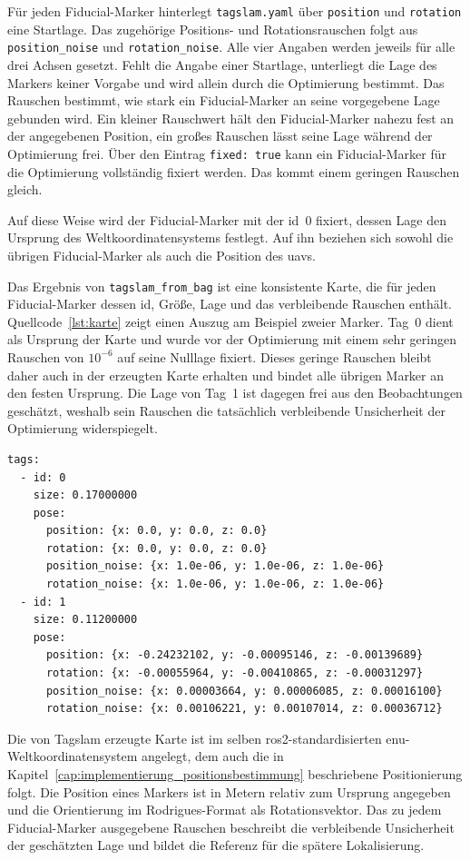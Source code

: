 Für jeden Fiducial-Marker hinterlegt \texttt{tagslam.yaml} über \texttt{position} und \texttt{rotation} eine Startlage.
Das zugehörige Positions- und Rotationsrauschen folgt aus \texttt{position\_\allowbreak noise} und \texttt{rota\allowbreak tion\_\allowbreak noise}.
Alle vier Angaben werden jeweils für alle drei Achsen gesetzt.
Fehlt die Angabe einer Startlage, unterliegt die Lage des Markers keiner Vorgabe und wird allein durch die Optimierung bestimmt.
Das Rauschen bestimmt, wie stark ein Fiducial-Marker an seine vorgegebene Lage gebunden wird. 
Ein kleiner Rauschwert hält den Fiducial-Marker nahezu fest an der angegebenen Position, ein großes Rauschen lässt seine Lage während der Optimierung frei.
Über den Eintrag \texttt{fixed: true} kann ein Fiducial-Marker für die Optimierung vollständig fixiert werden.
Das kommt einem geringen Rauschen gleich. 

Auf diese Weise wird der Fiducial-Marker mit der \gls{id}~0 fixiert, dessen Lage den Ursprung des Weltkoordinatensystems festlegt.
Auf ihn beziehen sich sowohl die übrigen Fiducial-Marker als auch die Position des \gls{uav}s.




Das Ergebnis von \texttt{tagslam\_from\_bag} ist eine konsistente Karte, die für jeden Fiducial-Marker dessen \gls{id}, Größe, Lage und das verbleibende Rauschen enthält.
Quellcode~\ref{lst:karte} zeigt einen Auszug am Beispiel zweier Marker.
Tag~0 dient als Ursprung der Karte und wurde vor der Optimierung mit einem sehr geringen Rauschen von $10^{-6}$ auf seine Nulllage fixiert.
Dieses geringe Rauschen bleibt daher auch in der erzeugten Karte erhalten und bindet alle übrigen Marker an den festen Ursprung.
Die Lage von Tag~1 ist dagegen frei aus den Beobachtungen geschätzt, weshalb sein Rauschen die tatsächlich verbleibende Unsicherheit der Optimierung widerspiegelt.
\newpage
\begin{lstlisting}[caption={Auszug einer erzeugten Karte}, label={lst:karte}, captionpos=b]
tags:
  - id: 0
    size: 0.17000000
    pose:
      position: {x: 0.0, y: 0.0, z: 0.0}
      rotation: {x: 0.0, y: 0.0, z: 0.0}
      position_noise: {x: 1.0e-06, y: 1.0e-06, z: 1.0e-06}
      rotation_noise: {x: 1.0e-06, y: 1.0e-06, z: 1.0e-06}
  - id: 1
    size: 0.11200000
    pose:
      position: {x: -0.24232102, y: -0.00095146, z: -0.00139689}
      rotation: {x: -0.00055964, y: -0.00410865, z: -0.00031297}
      position_noise: {x: 0.00003664, y: 0.00006085, z: 0.00016100}
      rotation_noise: {x: 0.00106221, y: 0.00107014, z: 0.00036712}
\end{lstlisting}
Die von Tag\gls{slam} erzeugte Karte ist im selben \gls{ros2}-standardisierten \gls{enu}-Weltkoordinatensystem angelegt, dem auch die in Kapitel~\ref{cap:implementierung_positionsbestimmung} beschriebene Positionierung folgt.
Die Position eines Markers ist in Metern relativ zum Ursprung angegeben und die Orientierung im Rodrigues-Format als Rotationsvektor.
Das zu jedem Fiducial-Marker ausgegebene Rauschen beschreibt die verbleibende Unsicherheit der geschätzten Lage und bildet die Referenz für die spätere Lokalisierung.



